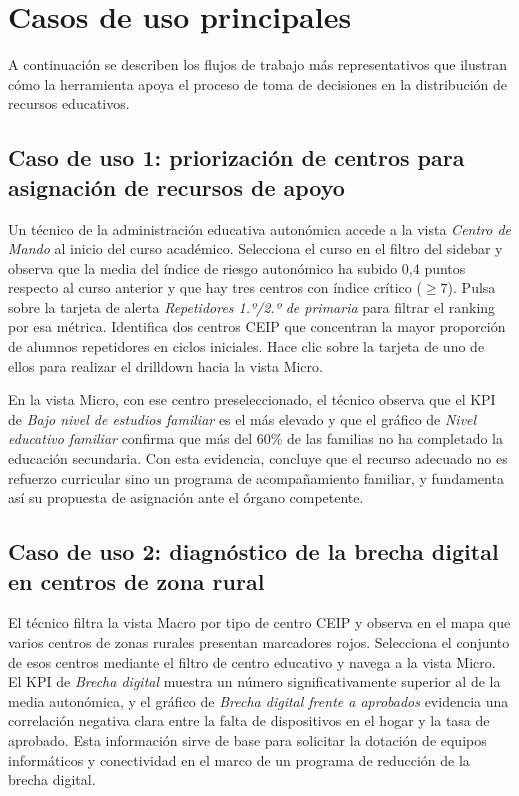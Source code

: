 \section{Casos de uso principales}

A continuación se describen los flujos de trabajo más representativos que ilustran cómo la herramienta apoya el proceso de toma de decisiones en la distribución de recursos educativos.

\subsection{Caso de uso 1: priorización de centros para asignación de recursos de apoyo}

Un técnico de la administración educativa autonómica accede a la vista \textit{Centro de Mando} al inicio del curso académico. Selecciona el curso en el filtro del sidebar y observa que la media del índice de riesgo autonómico ha subido 0,4 puntos respecto al curso anterior y que hay tres centros con índice crítico ($\geq 7$). Pulsa sobre la tarjeta de alerta \textit{Repetidores 1.º/2.º de primaria} para filtrar el ranking por esa métrica. Identifica dos centros CEIP que concentran la mayor proporción de alumnos repetidores en ciclos iniciales. Hace clic sobre la tarjeta de uno de ellos para realizar el drilldown hacia la vista Micro.

En la vista Micro, con ese centro preseleccionado, el técnico observa que el KPI de \textit{Bajo nivel de estudios familiar} es el más elevado y que el gráfico de \textit{Nivel educativo familiar} confirma que más del 60\% de las familias no ha completado la educación secundaria. Con esta evidencia, concluye que el recurso adecuado no es refuerzo curricular sino un programa de acompañamiento familiar, y fundamenta así su propuesta de asignación ante el órgano competente.

\subsection{Caso de uso 2: diagnóstico de la brecha digital en centros de zona rural}

El técnico filtra la vista Macro por tipo de centro CEIP y observa en el mapa que varios centros de zonas rurales presentan marcadores rojos. Selecciona el conjunto de esos centros mediante el filtro de centro educativo y navega a la vista Micro. El KPI de \textit{Brecha digital} muestra un número significativamente superior al de la media autonómica, y el gráfico de \textit{Brecha digital frente a aprobados} evidencia una correlación negativa clara entre la falta de dispositivos en el hogar y la tasa de aprobado. Esta información sirve de base para solicitar la dotación de equipos informáticos y conectividad en el marco de un programa de reducción de la brecha digital.

